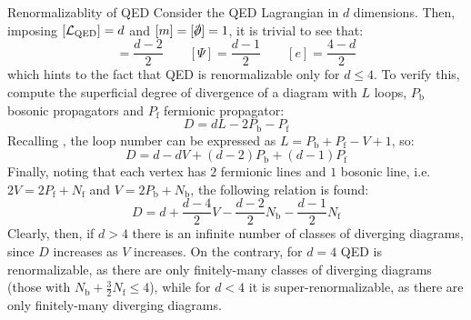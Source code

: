 \begin{observation}{Renormalizablity of QED}{}
  Consider the QED Lagrangian  in $ d $ dimensions. Then, imposing $ [\mathcal{L}_\text{QED}] = d $ and $ [m] = [\slashed{\pa}] = 1 $, it is trivial to see that:
  \begin{equation}
    [A_\mu] = \frac{d - 2}{2}
    \qquad
    [\Psi] = \frac{d - 1}{2}
    \qquad
    [e] = \frac{4 - d}{2}
  \end{equation}
  which hints to the fact that QED is renormalizable only for $ d \leq 4 $. To verify this, compute the superficial degree of divergence of a diagram with $ L $ loops, $ P_\text{b} $ bosonic propagators and $ P_\text{f} $ fermionic propagator:
  \begin{equation*}
    D = d L - 2 P_\text{b} - P_\text{f}
  \end{equation*}
  Recalling , the loop number can be expressed as $ L = P_\text{b} + P_\text{f} - V + 1 $, so:
  \begin{equation*}
    D = d - d V + (d - 2) P_\text{b} + (d - 1) P_\text{f}
  \end{equation*}
  Finally, noting that each vertex has $ 2 $ fermionic lines and $ 1 $ bosonic line, i.e. $ 2V = 2 P_\text{f} + N_\text{f} $ and $ V = 2 P_\text{b} + N_\text{b} $, the following relation is found:
  \begin{equation}
    D = d + \frac{d - 4}{2} V - \frac{d - 2}{2} N_\text{b} - \frac{d - 1}{2} N_\text{f}
    \label{eq:sup-div-qed}
  \end{equation}
  Clearly, then, if $ d > 4 $ there is an infinite number of classes of diverging diagrams, since $ D $ increases as $ V $ increases. On the contrary, for $ d = 4 $ QED is renormalizable, as there are only finitely-many classes of diverging diagrams (those with $ N_\text{b} + \frac{3}{2} N_\text{f} \leq 4 $), while for $ d < 4 $ it is super-renormalizable, as there are only finitely-many diverging diagrams.
\end{observation}


